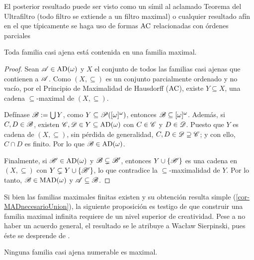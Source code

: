  El posterior resultado puede ser visto como un símil al aclamado Teorema del Ultrafiltro (todo filtro se extiende a un filtro maximal) o cualquier resultado afín en el que típicamente se haga uso de formas $\operatorname{AC}$ relacionadas con órdenes parciales

 \begin{lema}\label{lem-MADs}
  Toda familia casi ajena está contenida en una familia maximal.
 \end{lema}

 \begin{proof}
  Sean $\mathscr{A} \in \operatorname{AD}(\omega)$ y $X$ el conjunto de todos las familias casi ajenas que contienen a $\mathscr{A}$. Como $(X,\subseteq)$ es un conjunto parcialmente ordenado y no vacío, por el Principio de Maximalidad de Hausdorff ($\operatorname{AC}$), existe $Y \subseteq X$, una cadena $\subseteq$-maximal de $(X,\subseteq)$.

  Defínase $\mathscr{B}:=\mbox{$\bigcup$}\, Y$, como $Y \subseteq \mathscr{P}([\omega]^\omega)$, entonces $\mathscr{B} \subseteq [\omega]^{\omega}$. Además, si $C,D \in \mathscr{B}$, existen $\mathscr{C},\mathscr{D} \in Y \subseteq \operatorname{AD}(\omega)$ con $C \in \mathscr{C}$ y $D\in \mathscr{D}$. Puesto que $Y$ es cadena de $(X,\subseteq)$, sin pérdida de generalidad, $C,D \in \mathscr{D} \supseteq \mathscr{C}$; y con ello, $C \cap D$ es finito. Por lo que $\mathscr{B} \in \operatorname{AD}(\omega)$.

  Finalmente, si $\mathscr{B}' \in \operatorname{AD}(\omega)$ y $\mathscr{B} \subsetneq \mathscr{B}'$, entonces $Y \cup \{\mathscr{B}'\}$ es una cadena en $(X,\subseteq)$ con $Y \subsetneq Y\cup\{\mathscr{B}'\}$, lo que contradice la $\subseteq$-maximalidad de $Y$. Por lo tanto, $\mathscr{B}\in \operatorname{MAD}(\omega)$ y $\mathscr{A} \subseteq \mathscr{B}$.
 \end{proof}


 Si bien las familias maximales finitas existen y su obtención resulta simple (\autoref{cor-MADnecesarioUnion}), la siguiente proposición es testigo de que construir una familia maximal infinita requiere de un nivel superior de creatividad. Pese a no haber un acuerdo general, el resultado se le atribuye a Wacław Sierpinski, pues éste se desprende de \cite[Teo.~2, p.~458]{SierpinskiCardinal}.

 \begin{lema}\label{prop-MADnoNum}
  Ninguna familia casi ajena numerable es maximal.
 \end{lema}

